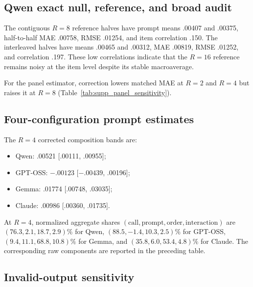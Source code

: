 \documentclass[letterpaper]{article}
\newcommand{\1}{\mathbf 1}
\begin{document}
\subsection{Qwen exact null, reference, and broad audit}







The contiguous $R=8$ reference halves have prompt means .00407 and .00375,
half-to-half MAE .00758, RMSE .01254, and item correlation .150. The
interleaved halves have means .00465 and .00312, MAE .00819, RMSE .01252,
and correlation .197. These low correlations indicate that the $R=16$
reference remains noisy at the item level despite its stable macroaverage.

For the panel estimator, correction lowers matched MAE at $R=2$ and $R=4$
but raises it at $R=8$ (Table~\ref{tab:supp_panel_sensitivity}).


\subsection{Four-configuration prompt estimates}



The $R=4$ corrected composition bands are:
\begin{itemize}
    \item Qwen: .00521 [.00111, .00955];
    \item GPT-OSS: $-.00123$ [$-.00439$, .00196];
    \item Gemma: .01774 [.00748, .03035];
    \item Claude: .00986 [.00360, .01735].
\end{itemize}



At $R=4$, normalized aggregate shares
$(\mathrm{call},\mathrm{prompt},\mathrm{order},\mathrm{interaction})$ are
$(76.3,2.1,18.7,2.9)\%$ for Qwen,
$(88.5,-1.4,10.3,2.5)\%$ for GPT-OSS,
$(9.4,11.1,68.8,10.8)\%$ for Gemma, and
$(35.8,6.0,53.4,4.8)\%$ for Claude. The corresponding raw components are
reported in the preceding table.

\subsection{Invalid-output sensitivity}
\end{document}
